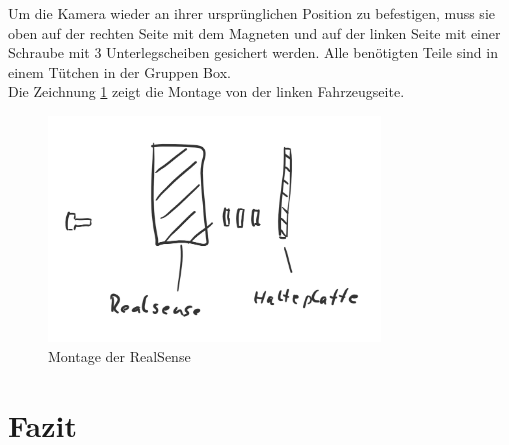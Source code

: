 \documentclass[a4paper,12pt]{report}
\begin{document}
Um die Kamera wieder an ihrer ursprünglichen Position zu befestigen, muss sie oben auf der rechten Seite mit dem Magneten und auf der linken Seite mit einer Schraube mit 3 Unterlegscheiben gesichert werden.
Alle benötigten Teile sind in einem Tütchen in der Gruppen Box. \\
Die Zeichnung \ref{RealSense-Montage} zeigt die Montage von der linken Fahrzeugseite.
\begin{figure}[ht]
	\centering
	\includegraphics[width=250pt,keepaspectratio]{assets/RealSense-Montage.PNG}
	\caption{Montage der RealSense}
	\label{RealSense-Montage}
\end{figure}


\chapter{Fazit}

\listoftables

\end{document}
